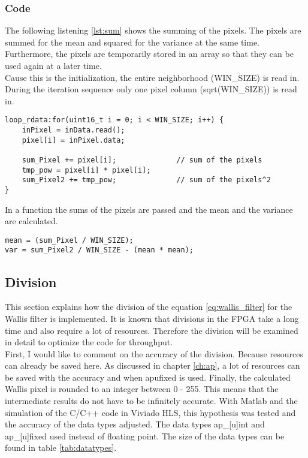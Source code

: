 \subsubsection*{Code}
The following listening \ref{lst:sum} shows the summing of the pixels. The pixels are summed for the mean and squared for the variance at the same time. Furthermore, the pixels are temporarily stored in an array so that they can be used again at a later time. \\
Cause this is the initialization, the entire neighborhood (WIN\_SIZE) is read in. During the iteration sequence only one pixel column (sqrt(WIN\_SIZE)) is read in. \\
\begin{minipage}{\textwidth}
\begin{lstlisting}[style=CStyle, caption=Calculation of the sum, label=lst:sum]
loop_rdata:for(uint16_t i = 0; i < WIN_SIZE; i++) {
	inPixel = inData.read();
	pixel[i] = inPixel.data;

	sum_Pixel += pixel[i];				// sum of the pixels
	tmp_pow = pixel[i] * pixel[i];
	sum_Pixel2 += tmp_pow;				// sum of the pixels^2
}
\end{lstlisting}
\end{minipage}

In a function the sums of the pixels are passed and the mean and the variance are calculated. \\
\begin{minipage}{\textwidth}
\begin{lstlisting}[style=CStyle, caption=Calculation of the mean and variance, label=lst:mean_var]
mean = (sum_Pixel / WIN_SIZE);
var = sum_Pixel2 / WIN_SIZE - (mean * mean);
\end{lstlisting}
\end{minipage}


\subsection{Division} \label{ch:hls:div}
This section explains how the division of the equation \ref{eq:wallis_filter} for the Wallis filter is implemented. It is known that divisions in the FPGA take a long time and also require a lot of resources. Therefore the division will be examined in detail to optimize the code for throughput. \\
First, I would like to comment on the accuracy of the division. Because resources can already be saved here. As discussed in chapter \ref{ch:ap}, a lot of resources can be saved with the accuracy and when apufixed is used.
Finally, the calculated Wallis pixel is rounded to an integer between 0 - 255. This means that the intermediate results do not have to be infinitely accurate. With Matlab and the simulation of the C/C++ code in Viviado HLS, this hypothesis was tested and the accuracy of the data types adjusted. The data types ap\_[u]int and ap\_[u]fixed used instead of floating point. The size of the data types can be found in table \ref{tab:datatypes}. 


